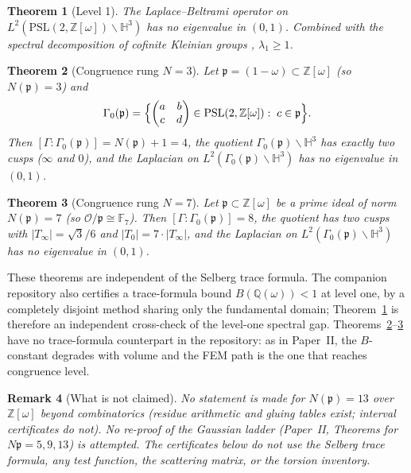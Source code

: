 \documentclass[11pt]{amsart}
\newtheorem{theorem}{Theorem}[section]
\newtheorem{remark}[theorem]{Remark}
\newcommand{\HH}{\mathbb{H}^3}
\newcommand{\ZZ}{\mathbb{Z}}
\newcommand{\PSL}{\mathrm{PSL}}
\newcommand{\p}{\mathfrak{p}}
\begin{document}
\begin{theorem}[Level 1]\label{thm:A}
The Laplace--Beltrami operator on
$L^2(\PSL(2,\ZZ[\omega])\backslash\HH)$ has no eigenvalue in $(0,1)$.
Combined with the spectral decomposition of cofinite Kleinian groups
\cite[Thm.~3.8.1]{Friedman}, $\lambda_1\ge 1$.
\end{theorem}

\begin{theorem}[Congruence rung $N=3$]\label{thm:B}
Let $\p=(1-\omega)\subset\ZZ[\omega]$ (so $N(\p)=3$) and
\[
  \Gamma_0(\p)
  =\Bigl\{\begin{pmatrix}a&b\\c&d\end{pmatrix}\in\PSL(2,\ZZ[\omega])
  :\;c\in\p\Bigr\}.
\]
Then $[\Gamma:\Gamma_0(\p)]=N(\p)+1=4$, the quotient
$\Gamma_0(\p)\backslash\HH$ has exactly two cusps ($\infty$ and $0$), and
the Laplacian on $L^2(\Gamma_0(\p)\backslash\HH)$ has no eigenvalue in
$(0,1)$.
\end{theorem}

\begin{theorem}[Congruence rung $N=7$]\label{thm:Btwo}
Let $\p\subset\ZZ[\omega]$ be a prime ideal of norm $N(\p)=7$ (so
$\mathcal{O}/\p\cong\mathbb{F}_7$).  Then $[\Gamma:\Gamma_0(\p)]=8$,
the quotient has two cusps with $|T_\infty|=\sqrt{3}/6$ and
$|T_0|=7\cdot|T_\infty|$, and the Laplacian on
$L^2(\Gamma_0(\p)\backslash\HH)$ has no eigenvalue in $(0,1)$.
\end{theorem}

These theorems are independent of the Selberg trace formula.  The companion
repository also certifies a trace-formula bound $B(\mathbb{Q}(\omega))<1$
at level one, by a completely disjoint method sharing only the fundamental
domain; Theorem~\ref{thm:A} is therefore an independent cross-check of the
level-one spectral gap.  Theorems~\ref{thm:B}--\ref{thm:Btwo} have no
trace-formula counterpart in the repository: as in Paper~II, the
$B$-constant degrades with volume and the FEM path is the one that reaches
congruence level.

\begin{remark}[What is not claimed]
No statement is made for $N(\p)=13$ over $\ZZ[\omega]$ beyond
combinatorics (residue arithmetic and gluing tables exist; interval
certificates do not).  No re-proof of the Gaussian ladder
(Paper~II, Theorems for $N\p=5,9,13$) is attempted.  The certificates
below do not use the Selberg trace formula, any test function, the
scattering matrix, or the torsion inventory.
\end{remark}
\end{document}
